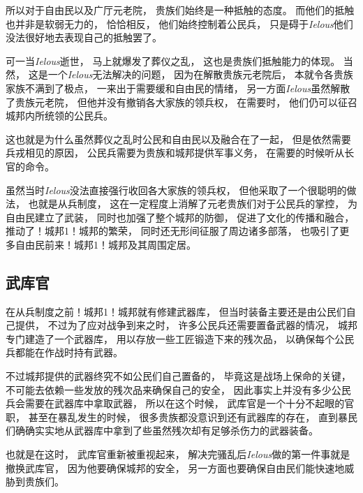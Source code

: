 \documentclass[12pt, a4paper]{ctexart}
\begin{document}
        所以对于自由民以及广厅元老院，
        贵族们始终是一种抵触的态度。
        而他们的抵触也并非是软弱无力的，
        恰恰相反，
        他们始终控制着公民兵，
        只是碍于\emph{Ielous}他们没法很好地去表现自己的抵触罢了。

        可一当\emph{Ielous}逝世，
        马上就爆发了葬仪之乱，
        这也是贵族们抵触能力的体现。
        当然，
        这是一个\emph{Ielous}无法解决的问题，
        因为在解散贵族元老院后，
        本就令各贵族家族不满到了极点，
        一来出于需要缓和自由民的情绪，
        另一方面\emph{Ielous}虽然解散了贵族元老院，
        但他并没有撤销各大家族的领兵权，
        在需要时，
        他们仍可以征召城邦内所统领的公民兵。

        这也就是为什么虽然葬仪之乱时公民和自由民以及融合在了一起，
        但是依然需要兵戎相见的原因，
        公民兵需要为贵族和城邦提供军事义务，
        在需要的时候听从长官的命令。

        虽然当时\emph{Ielous}没法直接强行收回各大家族的领兵权，
        但他采取了一个很聪明的做法，
        也就是从兵制度，
        这在一定程度上消解了元老贵族们对于公民兵的掌控，
        为自由民建立了武装，
        同时也加强了整个城邦的防御，
        促进了文化的传播和融合，
        推动了！城邦1！城邦的繁荣，
        同时还无形间征服了周边诸多部落，
        也吸引了更多自由民前来！城邦1！城邦及其周围定居。
    \subsection{武库官}
        在从兵制度之前！城邦1！城邦就有修建武器库，
        但当时装备主要还是由公民们自己提供，
        不过为了应对战争到来之时，
        许多公民兵还需要置备武器的情况，
        城邦专门建造了一个武器库，
        用以存放一些工匠锻造下来的残次品，
        以确保每个公民兵都能在作战时持有武器。

        不过城邦提供的武器终究不如公民们自己置备的，
        毕竟这是战场上保命的关键，
        不可能去依赖一些发放的残次品来确保自己的安全，
        因此事实上并没有多少公民兵会需要在武器库中拿取武器，
        所以在这个时候，
        武库官是一个十分不起眼的官职，
        甚至在暴乱发生的时候，
        很多贵族都没意识到还有武器库的存在，
        直到暴民们确确实实地从武器库中拿到了些虽然残次却有足够杀伤力的武器装备。

        也就是在这时，
        武库官重新被重视起来，
        解决完骚乱后\emph{Ielous}做的第一件事就是撤换武库官，
        因为他要确保城邦的安全，
        另一方面也要确保自由民们能快速地威胁到贵族们。
\end{document}
